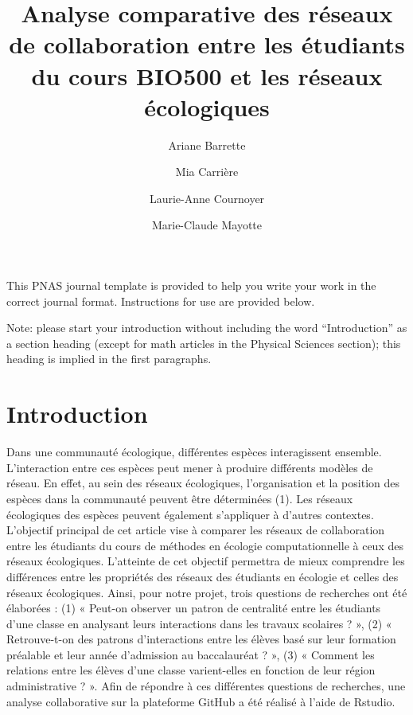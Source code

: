 \documentclass[9pt,twocolumn,twoside,]{pnas-new}
\title{Analyse comparative des réseaux de collaboration entre les
étudiants du cours BIO500 et les réseaux écologiques}
\author[a,1]{Ariane Barrette}
\author[a]{Mia Carrière}
\author[a]{Laurie-Anne Cournoyer}
\author[a]{Marie-Claude Mayotte}
\affil[a]{Département de biologie, Faculté des sciences, Université de
Sherbrooke, Sherbrooke, Québec, J1K 2R1}
\begin{document}
\verticaladjustment{-2pt}



\maketitle
\thispagestyle{firststyle}



This PNAS journal template is provided to help you write your work in
the correct journal format. Instructions for use are provided below.

Note: please start your introduction without including the word
``Introduction'' as a section heading (except for math articles in the
Physical Sciences section); this heading is implied in the first
paragraphs.

\hypertarget{introduction}{%
\section{Introduction}\label{introduction}}

Dans une communauté écologique, différentes espèces interagissent
ensemble. L'interaction entre ces espèces peut mener à produire
différents modèles de réseau. En effet, au sein des réseaux écologiques,
l'organisation et la position des espèces dans la communauté peuvent
être déterminées (1). Les réseaux écologiques des espèces peuvent
également s'appliquer à d'autres contextes. L'objectif principal de cet
article vise à comparer les réseaux de collaboration entre les étudiants
du cours de méthodes en écologie computationnelle à ceux des réseaux
écologiques. L'atteinte de cet objectif permettra de mieux comprendre
les différences entre les propriétés des réseaux des étudiants en
écologie et celles des réseaux écologiques. Ainsi, pour notre projet,
trois questions de recherches ont été élaborées : (1) « Peut-on observer
un patron de centralité entre les étudiants d'une classe en analysant
leurs interactions dans les travaux scolaires ? », (2) « Retrouve-t-on
des patrons d'interactions entre les élèves basé sur leur formation
préalable et leur année d'admission au baccalauréat ? », (3) « Comment
les relations entre les élèves d'une classe varient-elles en fonction de
leur région administrative ? ». Afin de répondre à ces différentes
questions de recherches, une analyse collaborative sur la plateforme
GitHub a été réalisé à l'aide de Rstudio.
\end{document}

